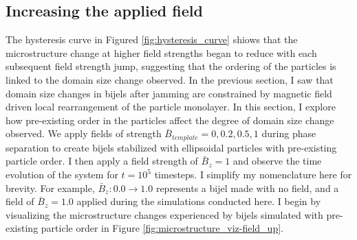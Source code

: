 \subsection{Increasing the applied
field}\label{increasing-the-applied-field}

The hysteresis curve in Figured \ref{fig:hysteresis_curve} shiows that the microstructure change at higher
field strengths began to reduce with each subsequent field strength
jump, suggesting that the ordering of the particles is linked to the
domain size change observed. In the previous section, I saw that domain
size changes in bijels after jamming are constrained by magnetic field
driven local rearrangement of the particle monolayer. In this section,
I explore how pre-existing order in the particles affect the degree of
domain size change observed. We apply fields of strength
$\bar{B}_{template} = 0, 0.2, 0.5, 1$ during phase separation to
create bijels stabilized with ellipsoidal particles with pre-existing
particle order. I then apply a field strength of $\bar{B}_z = 1$ and
observe the time evolution of the system for $t = 10^5$ timesteps. I
simplify my nomenclature here for brevity. For example,
$\bar{B}_z: 0.0 \rightarrow 1.0$ represents a bijel made with no
field, and a field of $\bar{B}_z = 1.0$ applied during the simulations conducted here. 
I begin by visualizing the microstructure
changes experienced by bijels simulated with pre-existing particle order
in Figure \ref{fig:microstructure_viz-field_up}.

